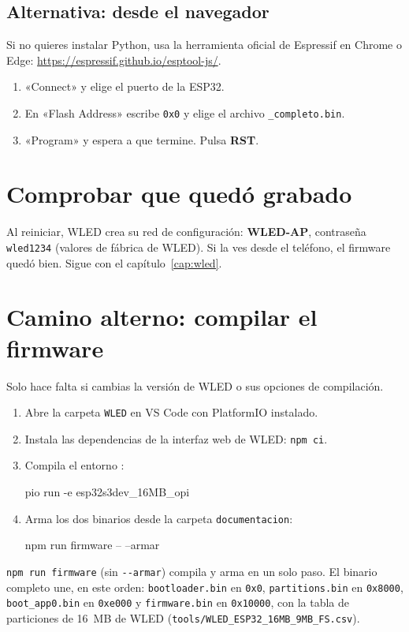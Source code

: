 \subsection{Alternativa: desde el navegador}
Si no quieres instalar Python, usa la herramienta oficial de Espressif en Chrome o Edge: \url{https://espressif.github.io/esptool-js/}.
\begin{enumerate}
\item «Connect» y elige el puerto de la ESP32.
\item En «Flash Address» escribe \texttt{0x0} y elige el archivo \texttt{\_completo.bin}.
\item «Program» y espera a que termine. Pulsa \textbf{RST}.
\end{enumerate}


\section{Comprobar que quedó grabado}

Al reiniciar, WLED crea su red de configuración: \textbf{WLED-AP}, contraseña \texttt{wled1234} (valores de fábrica de WLED). Si la ves desde el teléfono, el firmware quedó bien. Sigue con el capítulo~\ref{cap:wled}.


\section{Camino alterno: compilar el firmware}

Solo hace falta si cambias la versión de WLED o sus opciones de compilación.
\begin{enumerate}
\item Abre la carpeta \texttt{WLED} en VS Code con PlatformIO instalado.
\item Instala las dependencias de la interfaz web de WLED: \texttt{npm ci}.
\item Compila el entorno \texttt{}:
\begin{comando}
pio run -e esp32s3dev_16MB_opi
\end{comando}
\item Arma los dos binarios desde la carpeta \texttt{documentacion}:
\begin{comando}
npm run firmware -- --armar
\end{comando}
\end{enumerate}
\texttt{npm run firmware} (sin \texttt{-{}-armar}) compila y arma en un solo paso. El binario completo une, en este orden: \texttt{bootloader.bin} en \texttt{0x0}, \texttt{partitions.bin} en \texttt{0x8000}, \texttt{boot\_app0.bin} en \texttt{0xe000} y \texttt{firmware.bin} en \texttt{0x10000}, con la tabla de particiones de 16~MB de WLED (\texttt{tools/WLED\_ESP32\_16MB\_9MB\_FS.csv}).

